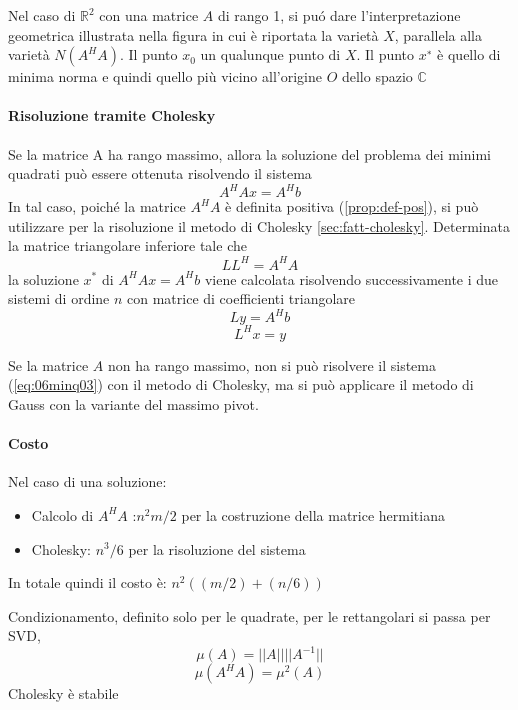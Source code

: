\begin{thproof}
\begin{enumerate}
  Nel caso di $\mathbb{R}^2$ con una matrice $A$ di rango 1, si pu\'o
  dare l’interpretazione geometrica illustrata nella figura in cui \`e
  riportata la variet\`a $X$, parallela alla variet\`a $N (A^H A)$.  Il
  punto $x_0$ un qualunque punto di $X$. Il punto $x^∗$ \`e quello di
  minima norma e quindi quello pi\`u vicino all’origine $O$ dello spazio
  $\mathbb{C}$
\end{enumerate}
\end{thproof}

\paragraph{Risoluzione tramite Cholesky} 
Se la matrice A ha rango massimo, allora la soluzione del problema dei
minimi quadrati pu\`o essere ottenuta risolvendo il sistema
$$A^{H}Ax = A^{H}b$$
In tal caso, poich\'e la matrice $A^{H}{A}$ \`e definita positiva
(\ref{prop:def-pos}), si pu\`o utilizzare per la risoluzione il metodo
di Cholesky \ref{sec:fatt-cholesky}.
Determinata la matrice triangolare inferiore tale che
$$LL^{H} =A^{H} A$$
la soluzione $x^{*}$ di $A^{H}Ax = A^{H}b$ viene calcolata risolvendo
successivamente i due sistemi di ordine $n$ con matrice di
coefficienti triangolare
$$Ly = A^H b$$
$$L^H x = y$$

Se la matrice $A$ non ha rango massimo, non si pu\`o risolvere il 
sistema 
(\ref{eq:06minq03}) con il metodo di Cholesky, ma si pu\`o
 applicare il metodo di Gauss con la variante del massimo pivot.

\paragraph{Costo}
Nel caso di una soluzione:
\begin{itemize}
\item Calcolo di $A^{H}A$ :$ n^{2}m/2$ per la costruzione della
matrice hermitiana
\item Cholesky: $n^{3}/6$ per la risoluzione del sistema
\end{itemize} In totale quindi il costo \`e: $n^{2}((m/2) + (n/6))$

\begin{workinprogress} 
Condizionamento, definito solo per le quadrate,
per le rettangolari si passa per SVD,
$$ \mu(A) = ||A|| ||A^{-1}||$$
$$  \mu(A^{H}A) = \mu^{2}(A)$$
Cholesky è stabile
\end{workinprogress}

